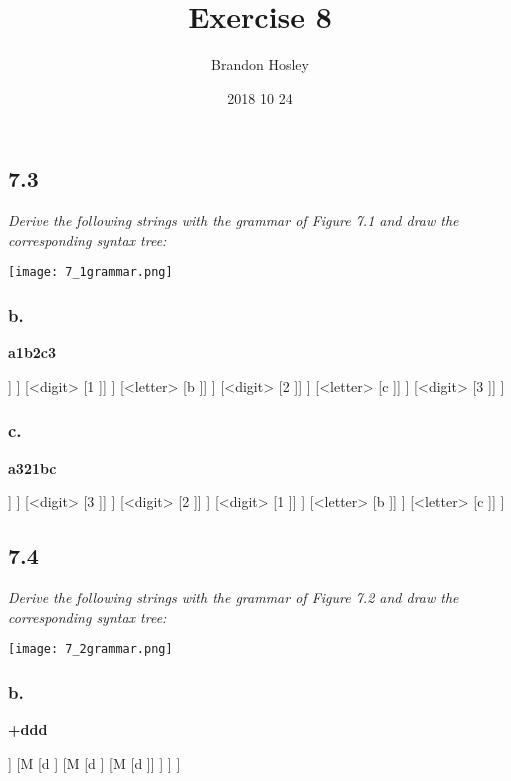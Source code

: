 \documentclass[a4paper,man,natbib]{apa6}
\title{Exercise 8}
\author{Brandon Hosley}
\date{2018 10 24}
\affiliation{Mike Davis}
\begin{document}
\maketitle
\raggedbottom

\subsection{7.3}
\singlespacing
\emph{Derive the following strings with the grammar of Figure 7.1 and draw the corresponding syntax tree:}
\begin{center} \texttt{[image: 7\_1grammar.png]} \\ \end{center}
\doublespacing
\subsubsection{b.}
\textbf{a1b2c3} \\
\begin{forest}
	[<identifier> 
		[<identifier> 
			[<identifier> 
				[<identifier> 
					[<identifier> 
						[<identifier> 
							[<letter> [a ]]
						]
						[<digit> [1 ]]
					]
					[<letter> [b ]]
				]
				[<digit> [2 ]]
			]
			[<letter> [c ]]
		] 
		[<digit> [3 ]] 
	]
\end{forest}
\subsubsection{c.}
\textbf{a321bc} \\
\begin{forest}
[<identifier> 
	[<identifier> 
		[<identifier> 
			[<identifier> 
				[<identifier> 
					[<identifier> 
						[<letter> [a ]]
					]
					[<digit> [3 ]]
				]
				[<digit> [2 ]]
			]
			[<digit> [1 ]]
		]
		[<letter> [b ]]
	] 
	[<letter> [c ]] 
]
\end{forest}
\clearpage
\subsection{7.4}
\singlespacing
\emph{Derive the following strings with the grammar of Figure 7.2 and draw the corresponding syntax tree:}
\begin{center} \texttt{[image: 7\_2grammar.png]} \\ \end{center}
\doublespacing
\subsubsection{b.}
\textbf{+ddd} \\
\begin{center}\begin{forest}
[<I> 
	[F [+ ]]
	[M 
		[d ]
		[M 
			[d ]
			[M [d ]]
		]
	]
]
\end{forest}\end{center}
\end{document}
